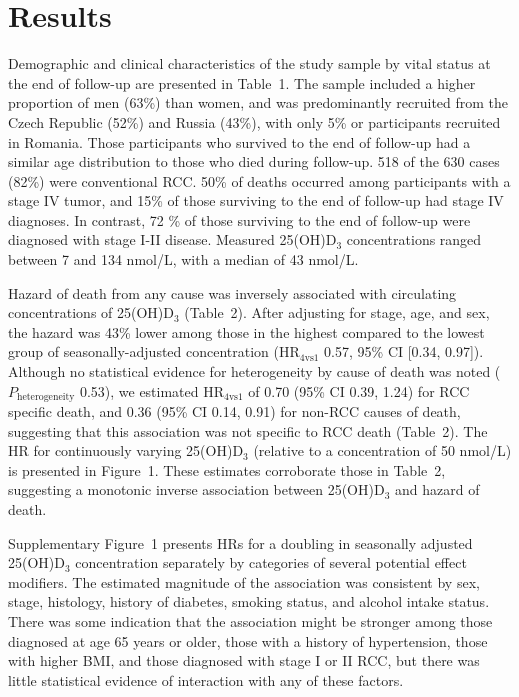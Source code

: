 \documentclass[a4paper,11pt]{article}
\begin{document}
\section*{Results}
Demographic and clinical characteristics of the study sample by vital status at 
the end of follow-up are presented in Table~1. The sample included a higher 
proportion of men (63\%) than women, and was predominantly recruited from the 
Czech Republic (52\%) and Russia (43\%), with only 5\% or participants 
recruited in Romania. Those participants who survived to the end of follow-up 
had a similar age distribution to those who died during follow-up. 518 
of the 630 cases (82\%) were conventional RCC. 50\% of deaths occurred among 
participants with a stage IV tumor, and 15\% of those surviving to the end of 
follow-up had stage IV diagnoses. In contrast, 72 \% of those surviving to the 
end of follow-up were diagnosed with stage I-II disease. Measured 25(OH)D$_3$ 
concentrations ranged between 7 and 134 nmol/L, with a median of 43 nmol/L.

Hazard of death from any cause was inversely associated with 
circulating concentrations of 25(OH)D$_3$ (Table~2). After adjusting for 
stage, age, and sex, the hazard was 43\% lower among those in the highest 
compared to the lowest group of seasonally-adjusted concentration 
(HR$_{4\text{vs}1}$ 0.57, 95\% CI [0.34, 0.97]). Although no statistical 
evidence for heterogeneity by cause of death was noted 
($P_\text{heterogeneity}$ 0.53), we estimated HR$_{4\text{vs}1}$ of 0.70 
(95\% CI 0.39, 1.24) for RCC specific death, and 0.36 (95\% CI 0.14, 0.91) for 
non-RCC causes of death, suggesting that this association was not specific to 
RCC death (Table~2). The HR for continuously varying 25(OH)D$_3$ (relative to a 
concentration of 50 nmol/L) is presented in Figure~1. These estimates 
corroborate those in Table~2, suggesting a monotonic inverse association between 
25(OH)D$_3$ and hazard of death.

Supplementary Figure~1 presents HRs for a doubling in seasonally adjusted 
25(OH)D$_3$ concentration separately by categories of several potential effect 
modifiers. The estimated magnitude of the association was consistent by sex, stage, 
histology, history of diabetes, smoking status, and alcohol intake status. 
There was some indication that the association might be stronger among those 
diagnosed at age 65 years or older, those with a history of hypertension, those 
with higher BMI, and those diagnosed with stage I or II RCC, but there was 
little statistical evidence of interaction with any of these factors. 
\end{document}
